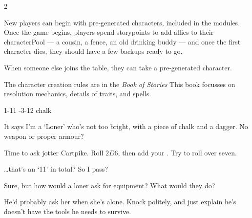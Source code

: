 \begin{multicols}{2}
\begin{description}
\end{description}

\bigLine

%

New players can begin with pre-generated characters, included in the modules.
Once the game begins, players spend \glspl{storypoint} to add allies to their \gls{characterPool} --- a cousin, a fence, an old drinking buddy --- and once the first character dies, they should have a few backups ready to go.

When someone else joins the table, they can take a pre-generated character.

The character creation rules are in the \textit{Book of Stories}%
\iftoggle{stories}{, \autopageref{character_rolls}.}{.} This book focusses on
resolution mechanics, details of \glspl{trait}, and \glspl{spell}.

\toggletrue{allyCharacter}
\toggletrue{genExamples}
%
  {{1}{-1}{1}}%
  {{-3}{-1}{2}}%
  {
    \setcounter{Melee}{1}
    \setcounter{Cultivation}{1}
    \setcounter{Stealth}{1}
    \setcounter{Vigilance}{1}
    \Dagger
  }%
  {}%
  {chalk}%
  {}%

%

\begin{description}\sffamily
  \item[Player 3:] It says I'm a `Loner' who's not too bright, with a piece of
  chalk and a dagger.  No weapon or proper armour?

  \item[\Gls{gm}:] Time to ask \Gls{jotter} Cartpike.  Roll $2D6$, then add
  your .
  Try to roll over  seven.

  \item[Player 3:]  \ldots that's an `11' in total?  So I pass?

  \item[\Gls{gm}:] Sure, but how would a loner ask for equipment?  What would
  they do?

  \item[Player 3:] He'd probably ask her when she's alone.  Knock politely, and
  just explain he's doesn't have the tools he needs to survive.
\end{description}


\end{multicols}

